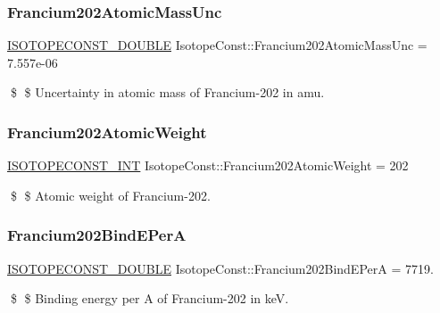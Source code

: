 \subsubsection{\texorpdfstring{Francium202\+Atomic\+Mass\+Unc}{Francium202AtomicMassUnc}}
{\footnotesize\ttfamily \mbox{\hyperlink{group___isotope_const-_macros_ga8f45a7272ce02c0b4c65c44636ed719a}{I\+S\+O\+T\+O\+P\+E\+C\+O\+N\+S\+T\+\_\+\+D\+O\+U\+B\+LE}} Isotope\+Const\+::\+Francium202\+Atomic\+Mass\+Unc = 7.\+557e-\/06}

\$ \$ Uncertainty in atomic mass of Francium-\/202 in amu. \mbox{\label{group___isotope_const-_francium-_fr202_gad070fcd23b8acb40490538bfe7f4297c}} 
\subsubsection{\texorpdfstring{Francium202\+Atomic\+Weight}{Francium202AtomicWeight}}
{\footnotesize\ttfamily \mbox{\hyperlink{group___isotope_const-_macros_ga5f18360b3e99483a35c32d789e62621c}{I\+S\+O\+T\+O\+P\+E\+C\+O\+N\+S\+T\+\_\+\+I\+NT}} Isotope\+Const\+::\+Francium202\+Atomic\+Weight = 202}

\$ \$ Atomic weight of Francium-\/202. \mbox{\label{group___isotope_const-_francium-_fr202_ga3b8fc8e47a97498c5f0425bc4bf92dfa}} 
\subsubsection{\texorpdfstring{Francium202\+Bind\+E\+PerA}{Francium202BindEPerA}}
{\footnotesize\ttfamily \mbox{\hyperlink{group___isotope_const-_macros_ga8f45a7272ce02c0b4c65c44636ed719a}{I\+S\+O\+T\+O\+P\+E\+C\+O\+N\+S\+T\+\_\+\+D\+O\+U\+B\+LE}} Isotope\+Const\+::\+Francium202\+Bind\+E\+PerA = 7719.}

\$ \$ Binding energy per A of Francium-\/202 in keV. \mbox{\label{group___isotope_const-_francium-_fr202_gaa8944bc0774dc5e32f6001be5b183e11}} 
